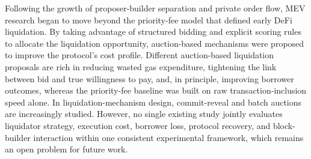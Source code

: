 \documentclass[conference]{IEEEtran}
\begin{document}
Following the growth of proposer-builder separation and private order
flow, MEV research began to move beyond the priority-fee model that
defined early DeFi liquidation. By taking advantage of structured
bidding and explicit scoring rules to allocate the liquidation
opportunity, auction-based mechanisms were proposed to improve the
protocol's cost profile. Different auction-based liquidation proposals
are rich in reducing wasted gas expenditure, tightening the link between
bid and true willingness to pay, and, in principle, improving borrower
outcomes, whereas the priority-fee baseline was built on raw
transaction-inclusion speed alone. In liquidation-mechanism design,
commit-reveal and batch auctions are increasingly studied. However,
no single existing study jointly evaluates liquidator strategy,
execution cost, borrower loss, protocol recovery, and block-builder
interaction within one consistent experimental framework, which remains
an open problem for future work.
\end{document}
